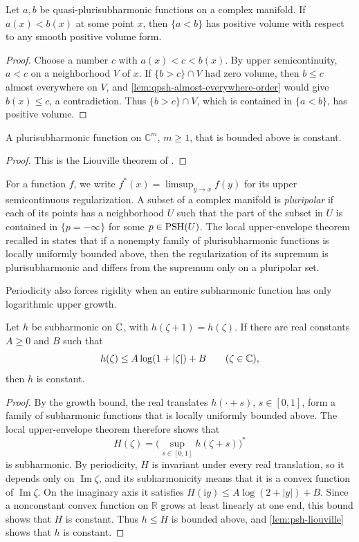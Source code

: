 \begin{lemma}\label{lem:strict-set-positive-volume}
Let $a,b$ be quasi-plurisubharmonic functions on a complex manifold. If $a(x)<b(x)$ at some point $x$, then $\{a<b\}$ has positive volume with respect to any smooth positive volume form.
\end{lemma}
\begin{proof}
Choose a number $c$ with $a(x)<c<b(x)$. By upper semicontinuity, $a<c$ on a neighborhood $V$ of $x$. If $\{b>c\}\cap V$ had zero volume, then $b\leq c$ almost everywhere on $V$, and \cref{lem:qpsh-almost-everywhere-order} would give $b(x)\leq c$, a contradiction. Thus $\{b>c\}\cap V$, which is contained in $\{a<b\}$, has positive volume.
\end{proof}

\begin{lemma}\label{lem:psh-liouville}
A plurisubharmonic function on $\mathbb C^m$, $m\geq1$, that is bounded above is constant.
\end{lemma}
\begin{proof}
This is the Liouville theorem of \cite[Lemma~2.28]{GZ17}.
\end{proof}

For a function $f$, we write $f^*(x)=\limsup_{y\to x}f(y)$ for its upper semicontinuous regularization. A subset of a complex manifold is \emph{pluripolar} if each of its points has a neighborhood $U$ such that the part of the subset in $U$ is contained in $\{p=-\infty\}$ for some $p\in\mathrm{PSH}(U)$. The local upper-envelope theorem recalled in \cite{SGPT} states that if a nonempty family of plurisubharmonic functions is locally uniformly bounded above, then the regularization of its supremum is plurisubharmonic and differs from the supremum only on a pluripolar set.

Periodicity also forces rigidity when an entire subharmonic function has only logarithmic upper growth.

\begin{lemma}\label{lem:periodic-subharmonic-log-growth}
Let $h$ be subharmonic on $\mathbb C$, with $h(\zeta+1)=h(\zeta)$. If there are real constants $A\geq0$ and $B$ such that
\[
 h(\zeta)\leq A\log(1+|\zeta|)+B\qquad(\zeta\in\mathbb C),
\]
then $h$ is constant.
\end{lemma}
\begin{proof}
By the growth bound, the real translates $h(\cdot+s)$, $s\in[0,1]$, form a family of subharmonic functions that is locally uniformly bounded above. The local upper-envelope theorem therefore shows that
\[
 H(\zeta)=\bigl(\sup_{s\in[0,1]}h(\zeta+s)\bigr)^*
\]
is subharmonic. By periodicity, $H$ is invariant under every real translation, so it depends only on $\operatorname{Im}\zeta$, and its subharmonicity means that it is a convex function of $\operatorname{Im}\zeta$. On the imaginary axis it satisfies
$H(\mathrm i y)\leq A\log(2+|y|)+B$. Since a nonconstant convex function on $\mathbb R$ grows at least linearly at one end, this bound shows that $H$ is constant. Thus $h\leq H$ is bounded above, and \cref{lem:psh-liouville} shows that $h$ is constant.
\end{proof}

